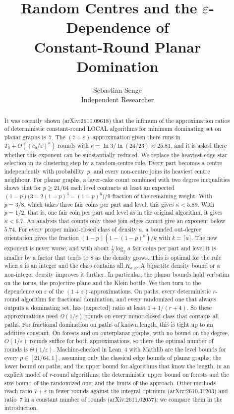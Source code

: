 \documentclass[11pt]{article}
\title{Random Centres and the \texorpdfstring{$\varepsilon$}{epsilon}-Dependence of\\ Constant-Round Planar Domination}
\author{Sebastian Senge\\ Independent Researcher}
\date{}
\theoremstyle{remark}
\begin{document}
\maketitle

\begin{abstract}
It was recently shown (arXiv:2610.09618) that the infimum of the approximation ratios of deterministic
constant-round LOCAL algorithms for minimum dominating set on planar graphs is~$7$. The
$(7+\varepsilon)$-approximation given there runs in $T_0+O((c_0/\varepsilon)^{\kappa})$ rounds with
$\kappa=\ln 3/\ln(24/23)\approx 25.81$, and it is asked there whether this exponent can be
substantially reduced. We replace the heaviest-edge star selection in its clustering step by a
random-centre rule. Every part becomes a centre independently with probability~$p$, and every
non-centre joins its heaviest centre neighbour. For planar graphs, a layer-cake count combined
with two degree inequalities shows that for $p\ge21/64$ each level contracts at least an expected
$(1-p)\big(3-2(1-p)^3-(1-p)^6\big)/9$ fraction of the remaining weight. With $p=3/8$, which takes three fair coins per part and level,
this gives $\kappa<5.89$. With $p=1/2$, that is, one fair coin per part and level as in the
original algorithm, it gives $\kappa<6.7$. An analysis that counts only these join edges cannot
give an exponent below $5.74$. For every proper minor-closed class of density $a$, a
bounded out-degree orientation gives the fraction $(1-p)(1-(1-p)^k)/k$ with $k=\lceil a\rceil$.
The new exponent is never worse, and with about $\frac12\log_2 a$ fair coins per part and level
it is smaller by a factor that tends to $8$ as the density grows. This is optimal for the rule when $a$ is an integer and the class contains all $K_{a,n}$.
A bipartite density bound or a non-integer density improves it further. In particular, the planar
bounds hold verbatim on the torus, the projective plane and the Klein bottle. We then turn to the
dependence on $\varepsilon$ of the $(1+\varepsilon)$-approximations. On paths, every deterministic
$r$-round algorithm for fractional domination, and every randomized one that always outputs a
dominating set, has (expected) ratio at least $1+1/(r+4)$. So these approximations need $\Omega(1/\varepsilon)$
rounds on every minor-closed class that contains all paths. For fractional domination on paths of
known length, this is tight up to an additive constant. On forests and on outerplanar graphs, with no bound on the degree,
$O(1/\varepsilon)$ rounds suffice for both approximations, so there the optimal number of rounds is
$\Theta(1/\varepsilon)$. Machine-checked in Lean~4 with Mathlib are the level bounds for every
$p\in[21/64,1]$, assuming only the classical edge bounds of planar graphs; the lower bound on paths,
and the upper bound for algorithms that know the length, in an explicit model of $r$-round
algorithms; the deterministic upper bound on forests and the size bound of the randomized one;
and the limits of the approach. Other methods reach ratio $7+\varepsilon$ in fewer rounds against the
integral optimum (arXiv:2610.31203) and ratio~$7$ in a constant number of rounds (arXiv:2611.02057);
we compare them in the introduction.
\end{abstract}
\end{document}
